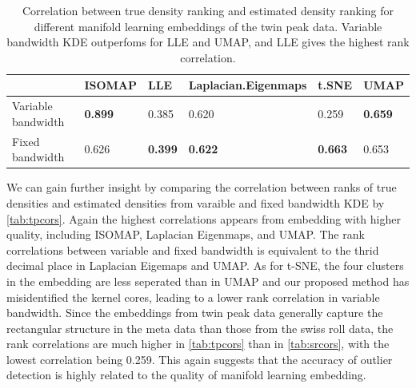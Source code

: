 \documentclass[11pt,a4paper,]{article}
\begin{document}
\begin{table}

\caption{\label{tab:tpcors}Correlation between true density ranking and estimated density ranking for different manifold learning embeddings of the twin peak data. Variable bandwidth KDE outperfoms for LLE and UMAP, and LLE gives the highest rank correlation.}
\centering
\begin{tabular}[t]{l>{}l>{}l>{}l>{}l>{}l}
\toprule
  & ISOMAP & LLE & Laplacian.Eigenmaps & t.SNE & UMAP\\
\midrule
Variable bandwidth & \textbf{0.899} & 0.385 & 0.620 & 0.259 & \textbf{0.659}\\
Fixed bandwidth & 0.626 & \textbf{0.399} & \textbf{0.622} & \textbf{0.663} & 0.653\\
\bottomrule
\end{tabular}
\end{table}

We can gain further insight by comparing the correlation between ranks of true densities and estimated densities from varaible and fixed bandwidth KDE by \autoref{tab:tpcors}.
Again the highest correlations appears from embedding with higher quality, including ISOMAP, Laplacian Eigenmaps, and UMAP. The rank correlations between variable and fixed bandwidth is equivalent to the thrid decimal place in Laplacian Eigemaps and UMAP. As for t-SNE, the four clusters in the embedding are less seperated than in UMAP and our proposed method has misidentified the kernel cores, leading to a lower rank correlation in variable bandwidth. Since the embeddings from twin peak data generally capture the rectangular structure in the meta data than those from the swiss roll data, the rank correlations are much higher in \autoref{tab:tpcors} than in \autoref{tab:srcors}, with the lowest correlation being 0.259. This again suggests that the accuracy of outlier detection is highly related to the quality of manifold learning embedding.
\end{document}

